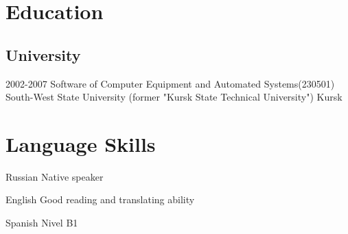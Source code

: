 \documentclass[11pt,a4paper,sans]{moderncv}
\newcommand{\lang}[2]{#2}
\begin{document}



\section
    {\lang
        {Образование}
        {Education}}

\subsection
    {\lang
        {Высшее образование}
        {University}}

\cventry
    {2002-2007}
    {\lang
        {Инженер по специальности «Программное обеспечение вычислительной техники и автоматизированных систем»}
        {Software of Computer Equipment and Automated Systems(230501)}}
    {\lang
        {«Юго-Западный государственный университет» (бывший «Курский государственный технический университет»)}
        {South-West State University (former "Kursk State Technical University")}}
    {\lang
        {Курск}
        {Kursk}}
    {}
    {}

\section
    {\lang
        {Языки}
        {Language Skills}}

\cvlanguage
    {\lang
        {Русский}
        {Russian}}
    {\lang
        {родной язык}
        {Native speaker}}
    {}

\cvlanguage
    {\lang
        {Английский}
        {English}}
    {\lang
        {читаю техническую литературу, могу поддержать разговор}
        {Good reading and translating ability}}
    {}

\cvlanguage
    {\lang
        {Испанский}
        {Spanish}}
    {\lang
        {уровень B1}
        {Nivel B1}}
    {}
\end{document}
